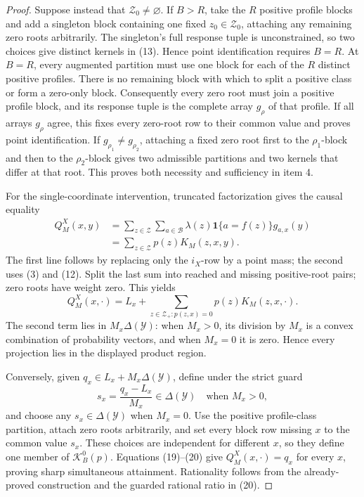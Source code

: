\documentclass{article}
\begin{document}
\begin{proof}
Suppose instead that \(\mathcal Z_0\ne\varnothing\).  If \(B>R\), take
the \(R\) positive profile blocks and add a singleton block containing
one fixed \(z_0\in\mathcal Z_0\), attaching any remaining zero roots
arbitrarily.  The singleton's full response tuple is unconstrained, so
two choices give distinct kernels in (13).  Hence point identification
requires \(B=R\).  At \(B=R\), every augmented partition must use one
block for each of the \(R\) distinct positive profiles.  There is no
remaining block with which to split a positive class or form a zero-only
block.  Consequently every zero root must join a positive profile block,
and its response tuple is the complete array \(g_\rho\) of that profile.
If all arrays \(g_\rho\) agree, this fixes every zero-root row to their
common value and proves point identification.  If
\(g_{\rho_1}\ne g_{\rho_2}\), attaching a fixed zero root first to the
\(\rho_1\)-block and then to the \(\rho_2\)-block gives two admissible
partitions and two kernels that differ at that root.  This proves both
necessity and sufficiency in item 4.

For the single-coordinate intervention, truncated factorization gives
the causal equality
\[
\begin{aligned}
 Q_M^X(x,y)
 &=\sum_{z\in\mathcal Z}\sum_{a\in\mathcal B}
   \lambda(z)\mathbf 1\{a=f(z)\}g_{a,x}(y)\\
 &=\sum_{z\in\mathcal Z}p(z)K_M(z,x,y).
\end{aligned}
\tag{18}
\]
The first line follows by replacing only the \(i_X\)-row by a point mass;
the second uses (3) and (12).  Split the last sum into reached and missing
positive-root pairs; zero roots have weight zero.  This yields
\[
 Q_M^X(x,\cdot)
 =L_x+\sum_{z\in\mathcal Z_+:p(z,x)=0}p(z)K_M(z,x,\cdot).
\tag{19}
\]
The second term lies in \(M_x\Delta(\mathcal Y)\): when \(M_x>0\), its
division by \(M_x\) is a convex combination of probability vectors, and
when \(M_x=0\) it is zero.  Hence every projection lies in the displayed
product region.

Conversely, given \(q_x\in L_x+M_x\Delta(\mathcal Y)\), define under the
strict guard
\[
 s_x=\frac{q_x-L_x}{M_x}\in\Delta(\mathcal Y)
 \quad\text{when }M_x>0,
\tag{20}
\]
and choose any \(s_x\in\Delta(\mathcal Y)\) when \(M_x=0\).  Use the
positive profile-class partition, attach zero roots arbitrarily, and set
every block row missing \(x\) to the common value \(s_x\).  These choices
are independent for different \(x\), so they define one member of
\(\mathcal K_B^0(p)\).  Equations (19)--(20) give
\(Q_M^X(x,\cdot)=q_x\) for every \(x\), proving sharp simultaneous
attainment.  Rationality follows from the already-proved construction and
the guarded rational ratio in (20).


\end{proof}
\end{document}
